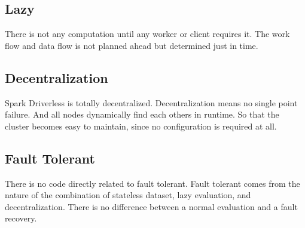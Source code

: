 \subsection{Lazy} %
\label{sub:lazy}
There is not any computation until any worker or client requires it.
The work flow and data flow is not planned ahead but determined just in time.

\subsection{Decentralization} %
\label{sub:decentralization}
Spark Driverless is totally decentralized.
Decentralization means no single point failure.
And all nodes dynamically find each others in runtime.
So that the cluster becomes easy to maintain, since no configuration is required at all.

\subsection{Fault Tolerant} %
\label{sub:fault_tolerant}
There is no code directly related to fault tolerant.
Fault tolerant comes from the nature of the combination of
stateless dataset, lazy evaluation, and decentralization.
There is no difference between a normal evaluation and a fault recovery.

